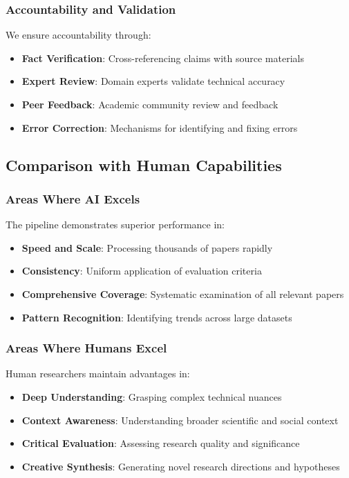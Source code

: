 \subsubsection{Accountability and Validation}

We ensure accountability through:

\begin{itemize}
    \item \textbf{Fact Verification}: Cross-referencing claims with source materials
    \item \textbf{Expert Review}: Domain experts validate technical accuracy
    \item \textbf{Peer Feedback}: Academic community review and feedback
    \item \textbf{Error Correction}: Mechanisms for identifying and fixing errors
\end{itemize}

\subsection{Comparison with Human Capabilities}

\subsubsection{Areas Where AI Excels}

The pipeline demonstrates superior performance in:

\begin{itemize}
    \item \textbf{Speed and Scale}: Processing thousands of papers rapidly
    \item \textbf{Consistency}: Uniform application of evaluation criteria
    \item \textbf{Comprehensive Coverage}: Systematic examination of all relevant papers
    \item \textbf{Pattern Recognition}: Identifying trends across large datasets
\end{itemize}

\subsubsection{Areas Where Humans Excel}

Human researchers maintain advantages in:

\begin{itemize}
    \item \textbf{Deep Understanding}: Grasping complex technical nuances
    \item \textbf{Context Awareness}: Understanding broader scientific and social context
    \item \textbf{Critical Evaluation}: Assessing research quality and significance
    \item \textbf{Creative Synthesis}: Generating novel research directions and hypotheses
\end{itemize}

